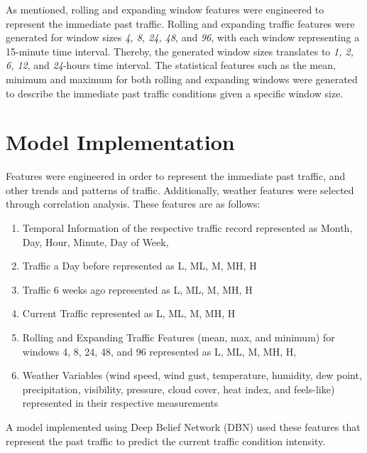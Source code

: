 As mentioned, rolling and expanding window features were engineered to represent the immediate past traffic. Rolling and expanding traffic features were generated for window sizes \textit{4, 8,  24, 48}, and \textit{96}, with each window representing a 15-minute time interval. Thereby, the generated window sizes translates to \textit{1, 2, 6, 12}, and \textit{24}-hours time interval. The statistical features such as the mean, minimum and maximum for both rolling and expanding windows were generated to describe the immediate past traffic conditions given a specific window size. 



\section{Model Implementation}
Features were engineered in order to represent the immediate past traffic, and other trends and patterns of traffic. Additionally, weather features were selected through correlation analysis. These features are as follows:

\begin{enumerate}
\item Temporal Information of the respective traffic record represented as Month, Day, Hour, Minute, Day of Week,
\item Traffic a Day before represented as L, ML, M, MH, H
\item Traffic 6 weeks ago represented as L, ML, M, MH, H
\item Current Traffic represented as L, ML, M, MH, H
\item Rolling and Expanding Traffic Features (mean, max, and minimum) for windows 4, 8, 24, 48, and 96 represented as L, ML, M, MH, H,
\item Weather Variables (wind speed, wind gust, temperature, humidity, dew point, precipitation, visibility, pressure, cloud cover, heat index, and feels-like) represented in their respective measurements 
\end{enumerate}

A model implemented using Deep Belief Network (DBN) used these features that represent the past traffic to predict the current traffic condition intensity. 

